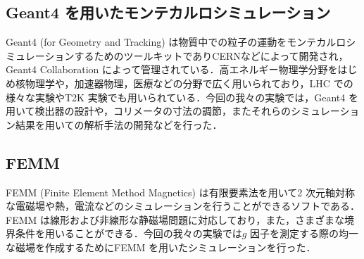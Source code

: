 \subsection{Geant4 を用いたモンテカルロシミュレーション}
Geant4 (for Geometry and Tracking) は物質中での粒子の運動をモンテカルロシミュレーションするためのツールキットでありCERNなどによって開発され，Geant4 Collaboration によって管理されている．高エネルギー物理学分野をはじめ核物理学や，加速器物理，医療などの分野で広く用いられており，LHC での様々な実験やT2K 実験でも用いられている．今回の我々の実験では，Geant4 を用いて検出器の設計や，コリメータの寸法の調節，またそれらのシミュレーション結果を用いての解析手法の開発などを行った．%

\subsection{FEMM}
FEMM (Finite Element Method Magnetics) は有限要素法を用いて2 次元軸対称な電磁場や熱，電流などのシミュレーションを行うことができるソフトである．FEMM は線形および非線形な静磁場問題に対応しており，また，さまざまな境界条件を用いることができる．今回の我々の実験では$g$ 因子を測定する際の均一な磁場を作成するためにFEMM を用いたシミュレーションを行った．

%
